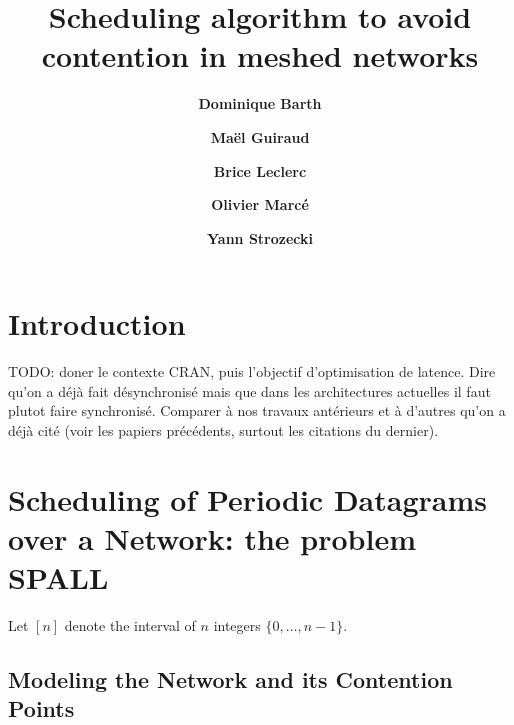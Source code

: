 \documentclass[english]{article}
\begin{document}
\title{Scheduling algorithm to avoid contention in meshed networks}
 

\newcommand{\todo}[1]{{\color{red} TODO: {#1}}}
\newcommand{\spall}{\textsc{SPALL}\xspace}
\newtheorem{theorem}{Theorem}
\newtheorem{lemma}[theorem]{Lemma}
\newtheorem{proposition}[theorem]{Proposition}
\newtheorem{corollary}[theorem]{Corollary}
\newtheorem{definition}{Definition}

\author[1]{\bf{ {Dominique Barth}}}
\author[1,2]{\bf{ {Ma\"el Guiraud}}}
\author[2]{\bf{ {Brice Leclerc}}}
\author[2]{\bf{ {Olivier Marc\'e}}}
\author[1]{\bf{ {Yann Strozecki}}}




\maketitle

\section{Introduction}

TODO: doner le contexte CRAN, puis l'objectif d'optimisation de latence. 
Dire qu'on a déjà fait désynchronisé mais que dans les architectures actuelles il faut plutot faire synchronisé.
Comparer à nos travaux antérieurs et à d'autres qu'on a déjà cité (voir les papiers précédents, surtout les citations du dernier).




\section{Scheduling of Periodic Datagrams over a Network: the problem \spall}


Let $[n]$ denote the interval of $n$ integers $\{0,\dots,n-1\}$.

  \subsection{Modeling the Network and its Contention Points}
\end{document}
